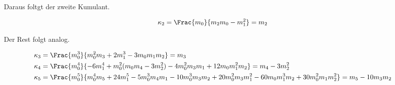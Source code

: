 \begin{solution}
Daraus foltgt der zweite Kumulant.

\begin{align*}
  \kappa_2 = \Frac{m_0}{m_2 m_0 - m_1^2} = m_2
\end{align*}

Der Rest folgt analog.

\begin{align*}
  \kappa_3 & =
  \Frac{m_0^3}{m_0^2 m_3 + 2 m_1^3 - 3 m_0 m_1 m_2} = m_3 \\
  \kappa_4 & =
  \Frac{m_0^4}{- 6 m_1^4 + m_0^2 (m_0 m_4 - 3 m_2^2) - 4 m_0^2 m_3 m_1 + 12 m_0 m_1^2 m_2} = m_4 - 3 m_2^2 \\
  \kappa_5 & =
  \Frac{m_0^5}{m_0^4 m_5 + 24 m_1^5 - 5 m_0^3 m_4 m_1 - 10 m_0^3 m_3 m_2 + 20 m_0^2 m_3 m_1^2 - 60 m_0 m_1^3 m_2 + 30 m_0^2 m_1 m_2^2} = m_5 - 10 m_3 m_2
\end{align*}

\end{solution}

